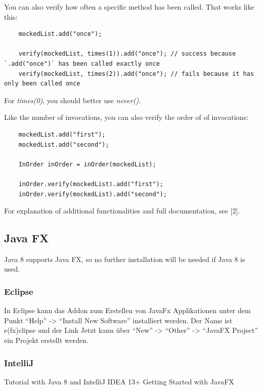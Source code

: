 \documentclass[11pt, a4paper]{article}
\begin{document}
You can also verify how often a specific method has been called. That works like this:

\begin{lstlisting}
    mockedList.add("once");
    
    verify(mockedList, times(1)).add("once"); // success because `.add("once")` has been called exactly once
    verify(mockedList, times(2)).add("once"); // fails because it has only been called once
\end{lstlisting}

For \textit{times(0)}, you should better use \textit{never()}.
 
Like the number of invocations, you can also verify the order of of invocations:

\begin{lstlisting}
    mockedList.add("first");
    mockedList.add("second");
    
    InOrder inOrder = inOrder(mockedList);
    
    inOrder.verify(mockedList).add("first");
    inOrder.verify(mockedList).add("second");  
\end{lstlisting} 
    
For explanation of additional functionalities and full documentation, see [2].

\subsection{Java FX}
Java 8 supports Java FX, so no further installation will be needed if Java 8 is used. 

\subsubsection{Eclipse}
In Eclipse kann das Addon zum Erstellen von JavaFx Applikationen unter dem Punkt “Help” -> “Install New Software” installiert werden. Der Name ist e(fx)clipse und der Link %
Jetzt kann über “New” -> “Other” -> “JavaFX Project” ein Projekt erstellt werden. 

\subsubsection{IntelliJ}
Tutorial with Java 8 and IntelliJ IDEA 13+
Getting Started with JavaFX
\end{document}
